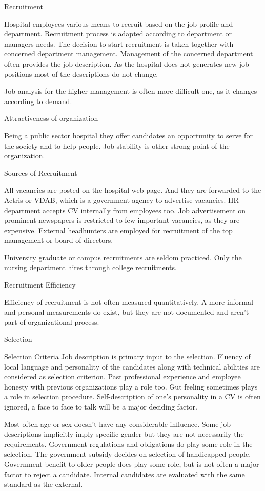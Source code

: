 \documentclass[a4paper,fleqn,11pt,dvips,titlepage]{article}
\numberwithin{figure}{section}
\numberwithin{equation}{section}
\begin{document}
Recruitment

Hospital employees various means to recruit based on the job profile and department. Recruitment process is adapted according to department or managers needs.  The decision to start recruitment is taken together with concerned department management. Management of the concerned department often provides the job description. As the hospital does not generates new job positions most of the descriptions do not change. 

Job analysis for the higher management is often more difficult one, as it changes according to demand.

Attractiveness of organization

Being a public sector hospital they offer candidates an opportunity to serve for the society and to help people. Job stability is other strong point of the organization. 


Sources of Recruitment

All vacancies are posted on the hospital web page.  And they are forwarded to the Actris or VDAB, which is a government agency to advertise vacancies. HR department accepts CV internally from employees too. Job advertisement on prominent newspapers is restricted to few important vacancies, as they are expensive.  External headhunters are employed for recruitment of the top management or board of directors. 

University graduate or campus recruitments are seldom practiced. Only the nursing department hires through college recruitments.


Recruitment Efficiency

Efficiency of recruitment is not often measured quantitatively. A more informal and personal measurements do exist, but they are not documented and aren’t part of organizational process.

Selection
 
Selection Criteria
Job description is primary input to the selection. Fluency of local language and personality of the candidates along with technical abilities are considered as selection criterion. Past professional experience and employee honesty with previous organizations play a role too. Gut feeling sometimes plays a role in selection procedure. Self-description of one’s personality in a CV is often ignored, a face to face to talk will be a major deciding factor. 

Most often age or sex doesn’t have any considerable influence. Some job descriptions implicitly imply specific gender but they are not necessarily the requirements. Government regulations and obligations do play some role in the selection. The government subsidy decides on selection of handicapped people. Government benefit to older people does play some role, but is not often a major factor to reject a candidate. Internal candidates are evaluated with the same standard as the external.
\end{document}
